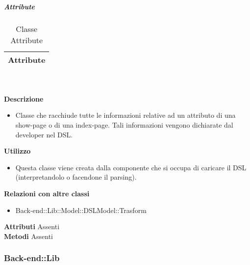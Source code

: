 			\subparagraph{Attribute} 
\begin{table}[ht]
\begin{center}
\bgroup
	\setlength{\arrayrulewidth}{0.6mm}
	\def\arraystretch{1}
		\begin{tabular}{ | p{12cm} | }
				\hline  
					\centerline{\textbf{Attribute}}
		\\ \hline 
				\hline
				\hline
		
		\end{tabular}
\egroup
\caption{Classe Attribute}
\end{center}
\end{table} \textbf{\\ \\ Descrizione}
\begin{itemize}
\item[] Classe che racchiude tutte le informazioni relative ad un attributo di una show-page o di una index-page. Tali informazioni vengono dichiarate dal developer nel DSL.
\end{itemize} 
\textbf{Utilizzo}
\begin{itemize}
\item[] Questa classe viene creata dalla componente che si occupa di caricare il DSL (interpretandolo o facendone il parsing).
\end{itemize}
\textbf{Relazioni con altre classi}
\begin{itemize}
\item{Back-end::Lib::Model::DSLModel::Trasform}
\end{itemize}
\textbf{Attributi}
Assenti \\
\textbf{Metodi}
Assenti \\

	\subsubsection{Back-end::Lib} 
